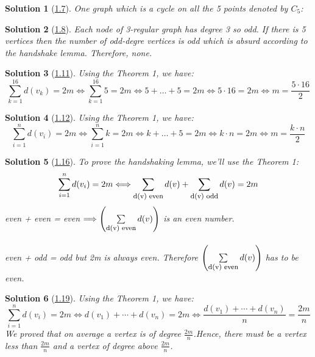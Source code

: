 \documentclass[10pt]{report}
\numberwithin{dummy}{section}
\theoremstyle{ocrenumbox}
\newtheorem{definitionTT}{Solution}[]
\theoremstyle{grayman}
\newenvironment{sol}{\begin{sBox}\begin{definitionTT}}{\end{definitionTT}\end{sBox}}
\begin{document}
\begin{sol}[\hypertarget{so17}{\hyperlink{exo17}{1.7}}]
 One graph which is a cycle on all the 5 points denoted by $C_5$:
 \begin{center}
\end{center}


\end{sol}
\begin{sol}[\hypertarget{so18}{\hyperlink{exo18}{1.8}}]
Each node of 3-regular graph has degree 3 so odd. If there is 5 vertices then the number of odd-degre vertices is odd which is absurd according to the handshake lemma. Therefore, none.
\end{sol}
\begin{sol}[\hypertarget{so111}{\hyperlink{exo111}{1.11}}]
Using the Theorem 1, we have:
\[\sum_{k=1}^{16} d(v_k) = 2m \Longleftrightarrow \sum_{k=1}^{16} 5 = 2m \Longleftrightarrow 5+\dots + 5 = 2m \Longleftrightarrow 5 \cdot 16 = 2m \Longleftrightarrow m = \frac{5\cdot 16}{2}\]

\end{sol}
\begin{sol}[\hypertarget{so112}{\hyperlink{exo112}{1.12}}]
Using the Theorem 1, we have:
\[\sum_{i=1}^{n} d(v_i) = 2m \Longleftrightarrow \sum_{i=1}^{n} k = 2m \Longleftrightarrow k+\dots + 5 = 2m \Longleftrightarrow k \cdot n = 2m \Longleftrightarrow m = \frac{k\cdot n}{2}\]
\end{sol}
\begin{sol}[\hypertarget{so116}{\hyperlink{exo116}{1.16}}]
To prove the handshaking lemma, we'll use the Theorem 1:
\[\sum_{i=1}^{n} d(v_i) = 2m \Longleftrightarrow \sum_{\footnotesize\mbox{d(v) even}} d(v) + \sum_{\footnotesize\mbox{d(v) odd}} d(v) = 2m \]
even + even = even $\Longrightarrow \left(\sum\limits_{\footnotesize\mbox{d(v) even}} d(v)\right)$ is an even number.\\ \\
even + odd = odd but 2m is always even. Therefore 
$\left(\sum\limits_{\footnotesize\mbox{d(v) even}} d(v)\right)$ has to be even.

\end{sol}
\begin{sol}[\hypertarget{so119}{\hyperlink{exo119}{1.19}}]
Using the Theorem 1, we have:
\[\sum_{i=1}^{n} d(v_i) = 2m \Longleftrightarrow d(v_1) + \cdots + d(v_n) = 2m \Longleftrightarrow \frac{d(v_1) + \cdots + d(v_n)}{n} = \frac{2m}{n}\]
We proved that on average a vertex is of degree $\frac{2m}{n}$.Hence, there must be a vertex less than $\frac{2m}{n}$ and a vertex of degree above $\frac{2m}{n}$.
\end{sol}
\end{document}
